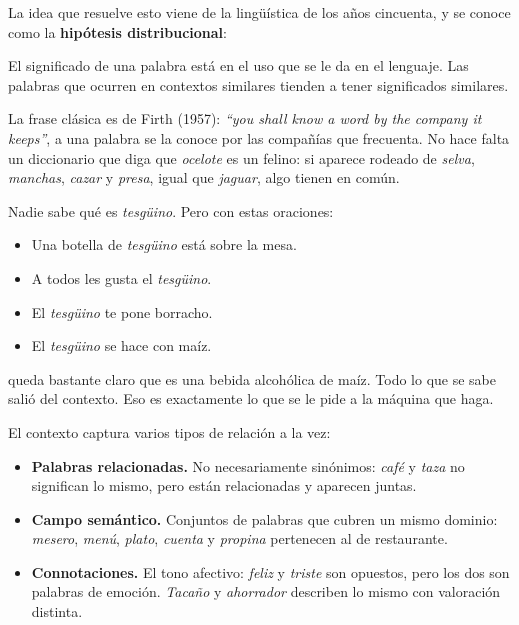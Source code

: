 \documentclass[11pt,letterpaper]{article}
\begin{document}
La idea que resuelve esto viene de la lingüística de los años
cincuenta, y se conoce como la \textbf{hipótesis distribucional}:

\begin{definicion}
    El significado de una palabra está en el uso que se le da en el
    lenguaje. Las palabras que ocurren en contextos similares tienden
    a tener significados similares.
\end{definicion}

La frase clásica es de Firth (1957): \textit{``you shall know a word
by the company it keeps''}, a una palabra se la conoce por las
compañías que frecuenta. No hace falta un diccionario que diga que
\textit{ocelote} es un felino: si aparece rodeado de \textit{selva},
\textit{manchas}, \textit{cazar} y \textit{presa}, igual que
\textit{jaguar}, algo tienen en común.

\begin{ejemplo}
    Nadie sabe qué es \textit{tesgüino}. Pero con estas oraciones:
    \begin{itemize}[itemsep=0.1em]
        \item Una botella de \textit{tesgüino} está sobre la mesa.
        \item A todos les gusta el \textit{tesgüino}.
        \item El \textit{tesgüino} te pone borracho.
        \item El \textit{tesgüino} se hace con maíz.
    \end{itemize}
    queda bastante claro que es una bebida alcohólica de maíz. Todo lo
    que se sabe salió del contexto. Eso es exactamente lo que se le
    pide a la máquina que haga.
\end{ejemplo}

El contexto captura varios tipos de relación a la vez:

\begin{itemize}[itemsep=0.3em]
    \item \textbf{Palabras relacionadas.} No necesariamente sinónimos:
          \textit{café} y \textit{taza} no significan lo mismo, pero
          están relacionadas y aparecen juntas.
    \item \textbf{Campo semántico.} Conjuntos de palabras que cubren un
          mismo dominio: \textit{mesero}, \textit{menú}, \textit{plato},
          \textit{cuenta} y \textit{propina} pertenecen al de
          restaurante.
    \item \textbf{Connotaciones.} El tono afectivo: \textit{feliz} y
          \textit{triste} son opuestos, pero los dos son palabras de
          emoción. \textit{Tacaño} y \textit{ahorrador} describen lo
          mismo con valoración distinta.
\end{itemize}
\end{document}
